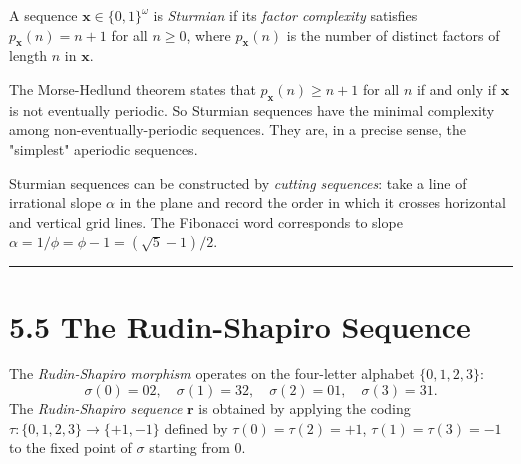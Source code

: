 \begin{definition}
A sequence $\mathbf{x} \in \{ 0,1\} ^\omega$ is \textit{Sturmian} if its \textit{factor complexity} satisfies $p_{\mathbf{x}}(n) = n + 1$ for all $n \geq 0$, where $p_{\mathbf{x}}(n)$ is the number of distinct factors of length $n$ in $\mathbf{x}$.

The Morse-Hedlund theorem states that $p_{\mathbf{x}}(n) \geq n+1$ for all $n$ if and only if $\mathbf{x}$ is not eventually periodic. So Sturmian sequences have the minimal complexity among non-eventually-periodic sequences. They are, in a precise sense, the "simplest" aperiodic sequences.

Sturmian sequences can be constructed by \textit{cutting sequences}: take a line of irrational slope $\alpha$ in the plane and record the order in which it crosses horizontal and vertical grid lines. The Fibonacci word corresponds to slope $\alpha = 1/\phi = \phi - 1 = (\sqrt{5}-1)/2$.

\bigskip\hrule\bigskip
\end{definition}

\section{5.5 The Rudin-Shapiro Sequence}

\begin{definition}
The \textit{Rudin-Shapiro morphism} operates on the four-letter alphabet $\{ 0,1,2,3\} $:
\[
\sigma(0) = 02, \quad \sigma(1) = 32, \quad \sigma(2) = 01, \quad \sigma(3) = 31.
\]
The \textit{Rudin-Shapiro sequence} $\mathbf{r}$ is obtained by applying the coding $\tau: \{ 0,1,2,3\}  \to \{ +1,-1\} $ defined by $\tau(0) = \tau(2) = +1$, $\tau(1) = \tau(3) = -1$ to the fixed point of $\sigma$ starting from $0$.
\end{definition}


